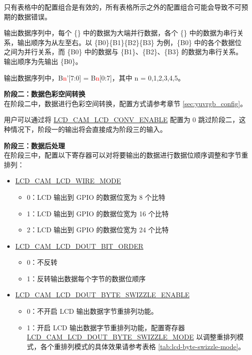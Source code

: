 \documentclass[main\_\_CN.tex]{subfiles}
\begin{document}
\begin{table}[H]
\begin{threeparttable}
\begin{tablenotes}
        \item[2] 只有表格中的配置组合是有效的，所有表格所示之外的配置组合可能会导致不可预期的数据错误。
        \item[3] 输出数据序列中，每个 \{\} 中的数据为大端并行数据，各个 \{\} 中的数据为串行关系，输出顺序为从左至右。以 \{B0\}\{B1\}\{B2\}\{B3\} 为例，\{B0\} 中的各个数据位之间为并行关系，而 \{B0\} 中的数据与 \{B1\}、\{B2\}、\{B3\} 的数据为串行关系。输出顺序为先输出 \{B0\}。
        \item[4] 输出数据序列中，B{\textcolor{red}{n}}'[7:0] = B{\textcolor{red}{n}}[0:7]，其中 n = 0,1,2,3,4,5。
    \end{tablenotes}
    \end{threeparttable}

\end{table}

\textbf{阶段二：数据色彩空间转换} \\
在阶段二中，数据进行色彩空间转换，配置方式请参考章节 \ref{sec:yuvrgb_config}。

\begin{tiplisting}
用户可以通过将 \hyperref[fielddesc:LCDCAMLCDCONVENABLE]{LCD\_CAM\_LCD\_CONV\_ENABLE} 配置为 0 跳过阶段二，这种情况下，阶段一的输出将会直接成为阶段三的输入。
\end{tiplisting}

\textbf{阶段三：数据后处理} \\
在阶段三中，配置以下寄存器可以对将要输出的数据进行数据位顺序调整和字节重排列：
\begin{itemize}
    \item \hyperref[fielddesc:LCDCAMLCDWIREMODE]{LCD\_CAM\_LCD\_WIRE\_MODE}
    \begin{itemize}
        \item 0：LCD 输出到 GPIO 的数据位宽为 8 个比特
        \item 1：LCD 输出到 GPIO 的数据位宽为 16 个比特
        \item 2：LCD 输出到 GPIO 的数据位宽为 24 个比特
    \end{itemize}
    \item \hyperref[fielddesc:LCDCAMLCDDOUTBITORDER]{LCD\_CAM\_LCD\_DOUT\_BIT\_ORDER}
    \begin{itemize}
        \item 0：不反转
        \item 1：反转输出数据每个字节的数据位顺序
    \end{itemize}
    \item \hyperref[fielddesc:LCDCAMLCDDOUTBYTESWIZZLEENABLE]{LCD\_CAM\_LCD\_DOUT\_BYTE\_SWIZZLE\_ENABLE}
    \begin{itemize}
        \item 0：不开启 LCD 输出数据字节重排列功能。
        \item 1：开启 LCD 输出数据字节重排列功能，配置寄存器 \hyperref[fielddesc:LCDCAMLCDDOUTBYTESWIZZLEMODE]{LCD\_CAM\_LCD\_DOUT\_BYTE\_SWIZZLE\_MODE} 以调整重排列模式，各个重排列模式的具体效果请参考表格 \ref{tab:lcd-byte-swizzle-mode}。
    \end{itemize}
\end{itemize}
\end{document}
